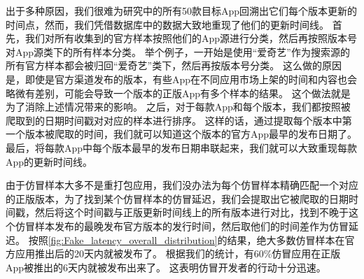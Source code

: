出于多种原因，我们很难为研究中的所有50款目标App回溯出它们每个版本更新的时间点，然而，我们凭借数据库中的数据大致地重现了他们的更新时间线。
首先，我们对所有收集到的官方样本按照他们的App源进行分类，然后再按照版本号对App源类下的所有样本分类。
举个例子，一开始是使用``爱奇艺''作为搜索源的所有官方样本都会被归回``爱奇艺''类下，然后再按版本号分类。
这么做的原因是，即使是官方渠道发布的版本，有些App在不同应用市场上架的时间和内容也会略微有差别，可能会导致一个版本的正版App有多个样本的结果。
这个做法就是为了消除上述情况带来的影响。
之后，对于每款App和每个版本，我们都按照被爬取到的日期时间戳对对应的样本进行排序。
这样的话，通过提取每个版本中第一个版本被爬取的时间，我们就可以知道这个版本的官方App最早的发布日期了。
最后，将每款App中每个版本最早的发布日期串联起来，我们就可以大致重现每款App的更新时间线。

由于仿冒样本大多不是重打包应用，我们没办法为每个仿冒样本精确匹配一个对应的正版版本，为了找到某个仿冒样本的仿冒延迟，我们会提取出它被爬取的日期时间戳，然后将这个时间戳与正版更新时间线上的所有版本进行对比，找到不晚于这个仿冒样本发布的最晚发布官方版本的发行时间，然后取他们的时间差作为仿冒延迟。
按照\autoref{fig:Fake_latency_overall_distribution}的结果，绝大多数仿冒样本在官方应用推出后的20天内就被发布了。
根据我们的统计，有60\%仿冒应用在正版App被推出的6天内就被发布出来了。
这表明仿冒开发者的行动十分迅速。

